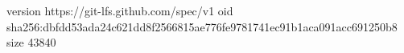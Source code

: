version https://git-lfs.github.com/spec/v1
oid sha256:dbfdd53ada24c621dd8f2566815ae776fe9781741ec91b1aca091acc691250b8
size 43840
